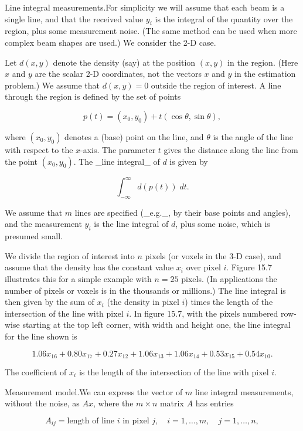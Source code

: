 
Line integral measurements.For simplicity we will assume that each beam is a single line, and that the received value \(y_{i}\) is the integral of the quantity over the region, plus some measurement noise. (The same method can be used when more complex beam shapes are used.) We consider the 2-D case.

Let \(d(x,y)\) denote the density (say) at the position \((x,y)\) in the region. (Here \(x\) and \(y\) are the scalar 2-D coordinates, not the vectors \(x\) and \(y\) in the estimation problem.) We assume that \(d(x,y)=0\) outside the region of interest. A line through the region is defined by the set of points

\[p(t)=(x_{0},y_{0})+t(\cos\theta,\sin\theta),\]

where \((x_{0},y_{0})\) denotes a (base) point on the line, and \(\theta\) is the angle of the line with respect to the \(x\)-axis. The parameter \(t\) gives the distance along the line from the point \((x_{0},y_{0})\). The _line integral_ of \(d\) is given by

\[\int_{-\infty}^{\infty}d(p(t))\;dt.\]

We assume that \(m\) lines are specified (_e.g._, by their base points and angles), and the measurement \(y_{i}\) is the line integral of \(d\), plus some noise, which is presumed small.

We divide the region of interest into \(n\) pixels (or voxels in the 3-D case), and assume that the density has the constant value \(x_{i}\) over pixel \(i\). Figure 15.7 illustrates this for a simple example with \(n=25\) pixels. (In applications the number of pixels or voxels is in the thousands or millions.) The line integral is then given by the sum of \(x_{i}\) (the density in pixel \(i\)) times the length of the intersection of the line with pixel \(i\). In figure 15.7, with the pixels numbered row-wise starting at the top left corner, with width and height one, the line integral for the line shown is

\[1.06x_{16}+0.80x_{17}+0.27x_{12}+1.06x_{13}+1.06x_{14}+0.53x_{15}+0.54x_{10}.\]

The coefficient of \(x_{i}\) is the length of the intersection of the line with pixel \(i\).

Measurement model.We can express the vector of \(m\) line integral measurements, without the noise, as \(Ax\), where the \(m\times n\) matrix \(A\) has entries

\[A_{ij}=\text{length of line $i$ in pixel $j$},\quad i=1,\ldots,m,\quad j=1,\ldots,n,\]

